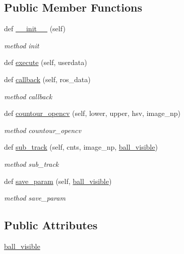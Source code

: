 \subsection*{Public Member Functions}
\begin{DoxyCompactItemize}
\item 
def \hyperlink{classstate__machine_1_1Find_aa7bd4d07590561e39233a3759ee25f49}{\+\_\+\+\_\+init\+\_\+\+\_\+} (self)
\begin{DoxyCompactList}\small\item\em method init \end{DoxyCompactList}\item 
def \hyperlink{classstate__machine_1_1Find_aa79a6408d288a202d766d86a34d26c22}{execute} (self, userdata)
\item 
def \hyperlink{classstate__machine_1_1Find_a41dd475617a4acb8b239b404257eacb1}{callback} (self, ros\+\_\+data)
\begin{DoxyCompactList}\small\item\em method callback \end{DoxyCompactList}\item 
def \hyperlink{classstate__machine_1_1Find_a1734b9a46e8cfcd5e5e34f992fcdd06e}{countour\+\_\+opencv} (self, lower, upper, hsv, image\+\_\+np)
\begin{DoxyCompactList}\small\item\em method countour\+\_\+opencv \end{DoxyCompactList}\item 
def \hyperlink{classstate__machine_1_1Find_ae571e4ebd97af2bfcabfc7b674cf53d8}{sub\+\_\+track} (self, cnts, image\+\_\+np, \hyperlink{classstate__machine_1_1Find_abf765d9904bb38e118449b2ebacd140a}{ball\+\_\+visible})
\begin{DoxyCompactList}\small\item\em method sub\+\_\+track \end{DoxyCompactList}\item 
def \hyperlink{classstate__machine_1_1Find_a8a35ffb44cefa8b89c7609d10040de76}{save\+\_\+param} (self, \hyperlink{classstate__machine_1_1Find_abf765d9904bb38e118449b2ebacd140a}{ball\+\_\+visible})
\begin{DoxyCompactList}\small\item\em method save\+\_\+param \end{DoxyCompactList}\end{DoxyCompactItemize}
\subsection*{Public Attributes}
\begin{DoxyCompactItemize}
\item 
\hyperlink{classstate__machine_1_1Find_abf765d9904bb38e118449b2ebacd140a}{ball\+\_\+visible}
\end{DoxyCompactItemize}
